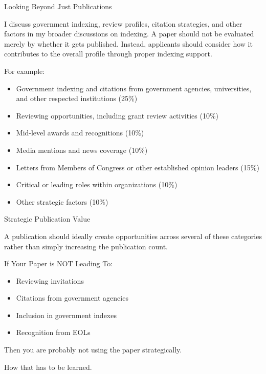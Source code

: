 \documentclass{beamer}
\begin{document}
	\begin{frame}{Looking Beyond Just Publications}
		\begin{block}{}
			I discuss government indexing, review profiles, citation strategies, and other factors in my broader discussions on indexing. A paper should not be evaluated merely by whether it gets published. Instead, applicants should consider how it contributes to the overall profile through proper indexing support.
		\end{block}
		\vspace{0.3cm}
		For example:
		\begin{itemize}
			\item Government indexing and citations from government agencies, universities, and other respected institutions (25\%)
			\item Reviewing opportunities, including grant review activities (10\%)
			\item Mid-level awards and recognitions (10\%)
			\item Media mentions and news coverage (10\%)
			\item Letters from Members of Congress or other established opinion leaders (15\%)
			\item Critical or leading roles within organizations (10\%)
			\item Other strategic factors (10\%)
		\end{itemize}
	\end{frame}
	
	\begin{frame}{Strategic Publication Value}
		\begin{block}{}
			A publication should ideally create opportunities across several of these categories rather than simply increasing the publication count.
		\end{block}
		\vspace{0.3cm}
		\begin{exampleblock}{If Your Paper is NOT Leading To:}
			\begin{itemize}
				\item Reviewing invitations
				\item Citations from government agencies
				\item Inclusion in government indexes
				\item Recognition from EOLs
			\end{itemize}
		\end{exampleblock}
		\vspace{0.3cm}
		\centering
		\textcolor{myred}{\Large Then you are probably not using the paper strategically.}
		\vspace{0.3cm}
		\begin{block}{}
			How that has to be learned.
		\end{block}
	\end{frame}
	
\end{document}
